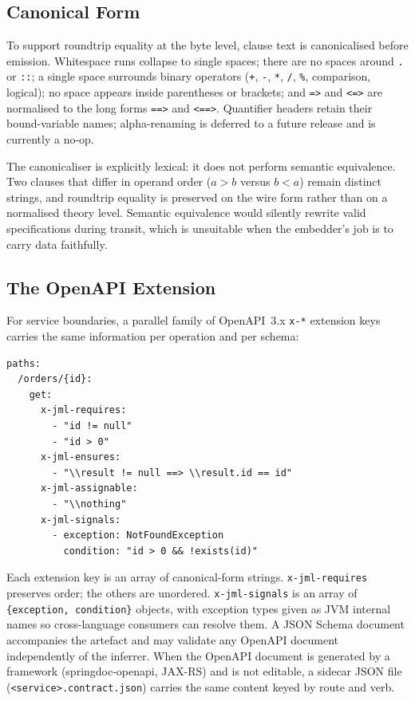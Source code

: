 \subsection{Canonical Form}

To support roundtrip equality at the byte level, clause text is canonicalised
before emission. Whitespace runs collapse to single spaces; there are no spaces
around \texttt{.} or \texttt{::}; a single space surrounds binary operators
(\texttt{+}, \texttt{-}, \texttt{*}, \texttt{/}, \texttt{\%}, comparison,
logical); no space appears inside parentheses or brackets; and \texttt{=>} and
\texttt{<=>} are normalised to the long forms \texttt{==>} and \texttt{<==>}.
Quantifier headers retain their bound-variable names; alpha-renaming is deferred
to a future release and is currently a no-op.

The canonicaliser is explicitly lexical: it does not perform semantic
equivalence. Two clauses that differ in operand order ($a > b$ versus $b < a$)
remain distinct strings, and roundtrip equality is preserved on the wire form
rather than on a normalised theory level. Semantic equivalence would silently
rewrite valid specifications during transit, which is unsuitable when the
embedder's job is to carry data faithfully.

\subsection{The OpenAPI Extension}

For service boundaries, a parallel family of OpenAPI~3.x \texttt{x-*} extension
keys carries the same information per operation and per schema:

\begin{lstlisting}[language={}]
paths:
  /orders/{id}:
    get:
      x-jml-requires:
        - "id != null"
        - "id > 0"
      x-jml-ensures:
        - "\\result != null ==> \\result.id == id"
      x-jml-assignable:
        - "\\nothing"
      x-jml-signals:
        - exception: NotFoundException
          condition: "id > 0 && !exists(id)"
\end{lstlisting}

Each extension key is an array of canonical-form strings.
\texttt{x-jml-requires} preserves order; the others are unordered.
\texttt{x-jml-signals} is an array of \texttt{\{exception, condition\}} objects,
with exception types given as JVM internal names so cross-language consumers can
resolve them. A JSON Schema document accompanies the artefact and may validate
any OpenAPI document independently of the inferrer. When the OpenAPI document is
generated by a framework (springdoc-openapi, JAX-RS) and is not editable, a
sidecar JSON file (\texttt{<service>.contract.json}) carries the same content
keyed by route and verb.

